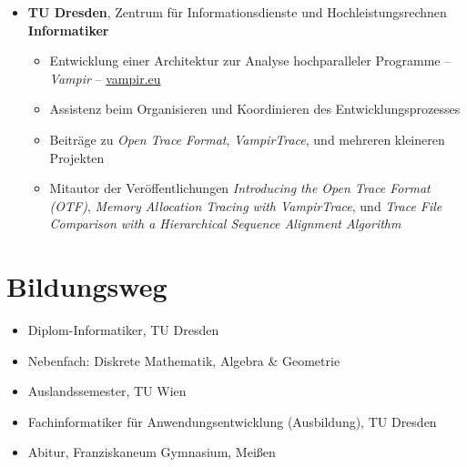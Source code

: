 \begin{itemize}
	\item {}
		\textbf{TU Dresden}, Zentrum f\"ur Informationsdienste und Hochleistungsrechnen \\
		\textbf{Informatiker}
		\begin{itemize}
			\item Entwicklung einer Architektur zur Analyse hochparalleler Programme -- \emph{Vampir} -- \href{http://www.vampir.eu}{vampir.eu}
			\item Assistenz beim Organisieren und Koordinieren des Entwicklungsprozesses
			\item Beitr\"age zu \emph{Open Trace Format}, \emph{VampirTrace}, und mehreren kleineren Projekten
			\item Mitautor der Ver\"offentlichungen \emph{Introducing the Open Trace Format (OTF)}, 
			\emph{Memory Allocation Tracing with VampirTrace}, und \emph{Trace File Comparison with a Hierarchical Sequence Alignment Algorithm}
		\end{itemize}
\end{itemize}

\pagebreak
\section*{Bildungsweg}
\begin{itemize}
	\item {}
		Diplom-Informatiker, TU Dresden
	\item \hspace{1em} Nebenfach: Diskrete Mathematik, Algebra \& Geometrie
	\item {}
		Auslandssemester, TU Wien
	\item {}
		Fachinformatiker f\"ur Anwendungsentwicklung (Ausbildung), TU Dresden
	\item {}
		Abitur, Franziskaneum Gymnasium, Mei\ss en
\end{itemize}

\customhrule
